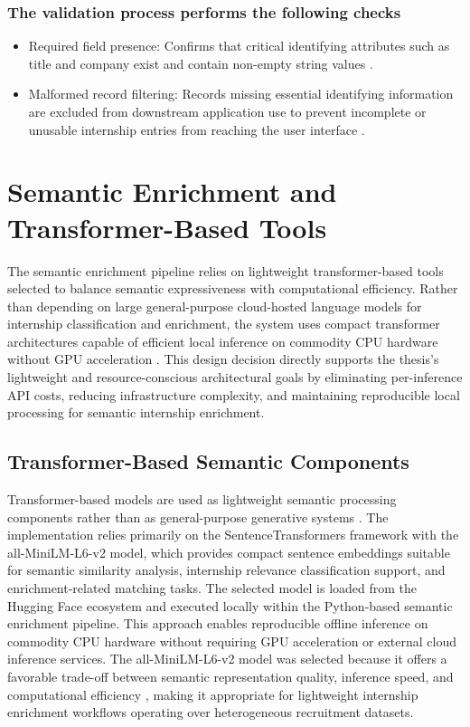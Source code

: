 \subsubsection*{The validation process performs the following checks}
\begin{itemize}
\item Required field presence: Confirms that critical identifying attributes such as title and company exist and contain non-empty string values \cite{batini2009methodologies}.
\item Malformed record filtering: Records missing essential identifying information are excluded from downstream application use to prevent incomplete or unusable internship entries from reaching the user interface \cite{chu2016data}.
\end{itemize}

\section{Semantic Enrichment and Transformer-Based Tools}
The semantic enrichment pipeline relies on lightweight transformer-based tools selected to balance semantic expressiveness with computational efficiency. Rather than depending on large general-purpose cloud-hosted language models for internship classification and enrichment, the system uses compact transformer architectures capable of efficient local inference on commodity CPU hardware without GPU acceleration \cite{vaswani2017attention, reimers2019sentence, menghani2023efficient}.
This design decision directly supports the thesis's lightweight and resource-conscious architectural goals by eliminating per-inference API costs, reducing infrastructure complexity, and maintaining reproducible local processing for semantic internship enrichment.
\subsection{Transformer-Based Semantic Components}
Transformer-based models are used as lightweight semantic processing components rather than as general-purpose generative systems \cite{vaswani2017attention}. The implementation relies primarily on the SentenceTransformers framework \cite{reimers2019sentence} with the all-MiniLM-L6-v2 model, which provides compact sentence embeddings suitable for semantic similarity analysis, internship relevance classification support, and enrichment-related matching tasks.
The selected model is loaded from the Hugging Face ecosystem and executed locally within the Python-based semantic enrichment pipeline. This approach enables reproducible offline inference on commodity CPU hardware without requiring GPU acceleration or external cloud inference services.
The all-MiniLM-L6-v2 model was selected because it offers a favorable trade-off between semantic representation quality, inference speed, and computational efficiency \cite{menghani2023efficient, schwartz2020green}, making it appropriate for lightweight internship enrichment workflows operating over heterogeneous recruitment datasets.

